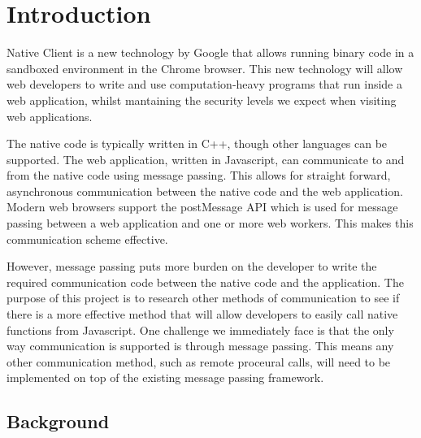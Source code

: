 
\chapter{Introduction} %

\label{ChapterX} %


Native Client \cite{yee2009native} is a new technology by Google that allows running binary code in a sandboxed environment in the Chrome browser. This new technology will allow web developers to write and use computation-heavy programs that run inside a web application, whilst mantaining the security levels we expect when visiting web applications.

The native code is typically written in C++, though other languages can be supported. The web application, written in Javascript, can communicate to and from the native code using message passing. This allows for straight forward, asynchronous communication between the native code and the web application. Modern web browsers support the postMessage API which is used for message passing between a web application and one or more web workers. This makes this communication scheme effective.

However, message passing puts more burden on the developer to write the required communication code between the native code and the application. The purpose of this project is to research other methods of communication to see if there is a more effective method that will allow developers to easily call native functions from Javascript. One challenge we immediately face is that the only way communication is supported is through message passing. This means any other communication method, such as remote proceural calls, will need to be implemented on top of the existing message passing framework.



\section{Background}
